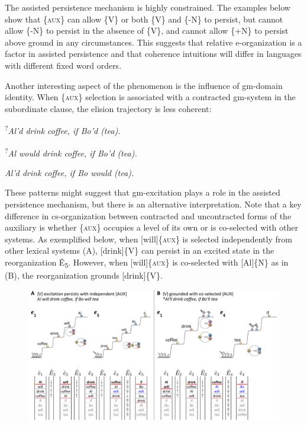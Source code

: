   The assisted persistence mechanism is highly constrained. The examples below show that \{\textsc{aux}\} can allow \{V\} or both \{V\} and \{-N\} to persist, but cannot allow \{-N\} to persist in the absence of \{V\}, and cannot allow \{+N\} to persist above ground in any circumstances. This suggests that relative e-organization is a factor in assisted persistence and that coherence intuitions will differ in languages with different fixed word orders. 

  Another interesting aspect of the phenomenon is the influence of gm-domain identity. When \{\textsc{aux}\} selection is associated with a contracted gm-system in the subordinate clause, the elision trajectory is less coherent: 

      \textsuperscript{?}\textit{Al’d drink coffee, if Bo’d (tea).}
\z

    \textsuperscript{?}\textit{Al would drink coffee, if Bo’d (tea).}
\z

    \textit{Al’d drink coffee, if Bo would (tea).}
\z

  These patterns might suggest that gm-excitation plays a role in the assisted persistence mechanism, but there is an alternative interpretation. Note that a key difference in cs-organization between contracted and uncontracted forms of the auxiliary is whether \{\textsc{aux}\} occupies a level of its own or is co-selected with other systems. As exemplified below, when [will]\{\textsc{aux}\} is selected independently from other lexical systems (A), [drink]\{V\} can persist in an excited state in the reorganization Ê\textsubscript{5}. However, when [will]\{\textsc{aux}\} is co-selected with [Al]\{N\} as in (B), the reorganization grounds [drink]\{V\}.

  
\begin{figure}
\includegraphics[width=\textwidth]{figures/Tilsen-img148.png}
\caption{\missingcaption}
\label{fig:}
\end{figure}
 

